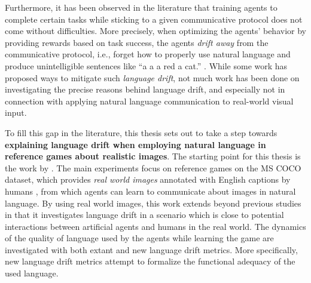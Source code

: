 Furthermore, it has been observed in the literature that training agents to complete certain tasks while sticking to a given communicative protocol does not come without difficulties. More precisely, when optimizing the agents' behavior by providing rewards based on task success, the agents \textit{drift away} from the communicative protocol, i.e., forget how to properly use natural language and produce unintelligible sentences like ``a a a red a cat.'' \parencite{lee2019countering, lazaridou2020multi, lu2020countering, lewis2017deal}. While some work has proposed ways to mitigate such \textit{language drift}, not much work has been done on investigating the precise reasons behind language drift, and especially not in connection with applying natural language communication to real-world visual input. 

To fill this gap in the literature, this thesis sets out to take a step towards \textbf{explaining language drift when employing natural language in reference games about realistic images}. The starting point for this thesis is the work by \cite{lazaridou2020multi}. The main  experiments focus on reference games on the MS COCO dataset, which provides \textit{real world images} annotated with English captions by humans \parencite{chen2015microsoft}, from which agents can learn to communicate about images in natural language. By using real world images, this work extends beyond previous studies in that it investigates language drift in a scenario which is close to potential interactions between artificial agents and humans in the real world. 
The dynamics of the quality of language used by the agents while learning the game are investigated with both extant and new language drift metrics. More specifically, new language drift metrics attempt to formalize the functional adequacy of the used language. 

